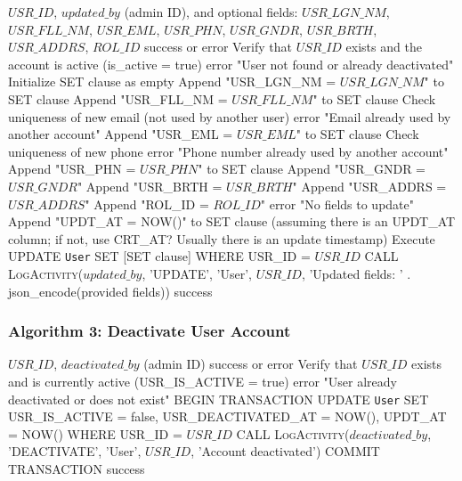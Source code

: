 \begin{algorithm}[H]
	\caption{Update User Account}
	\label{alg:update-user}
	\begin{algorithmic}[1]
		\REQUIRE $USR\_ID$, $updated\_by$ (admin ID), and optional fields: $USR\_LGN\_NM$, $USR\_FLL\_NM$, $USR\_EML$, $USR\_PHN$, $USR\_GNDR$, $USR\_BRTH$, $USR\_ADDRS$, $ROL\_ID$
		\ENSURE success or error
		\STATE Verify that $USR\_ID$ exists and the account is active (is\_active = true)
		\RETURN error "User not found or already deactivated"
		\ENDIF
		\STATE Initialize SET clause as empty
		\STATE Append "USR\_LGN\_NM = $USR\_LGN\_NM$" to SET clause
		\ENDIF
		\STATE Append "USR\_FLL\_NM = $USR\_FLL\_NM$" to SET clause
		\ENDIF
		\STATE Check uniqueness of new email (not used by another user)
		\RETURN error "Email already used by another account"
		\ENDIF
		\STATE Append "USR\_EML = $USR\_EML$" to SET clause
		\ENDIF
		\STATE Check uniqueness of new phone
		\RETURN error "Phone number already used by another account"
		\ENDIF
		\STATE Append "USR\_PHN = $USR\_PHN$" to SET clause
		\ENDIF
		 \STATE Append "USR\_GNDR = $USR\_GNDR$" \ENDIF
		 \STATE Append "USR\_BRTH = $USR\_BRTH$" \ENDIF
		 \STATE Append "USR\_ADDRS = $USR\_ADDRS$" \ENDIF
		 \STATE Append "ROL\_ID = $ROL\_ID$" \ENDIF
		\RETURN error "No fields to update"
		\ENDIF
		\STATE Append "UPDT\_AT = NOW()" to SET clause  (assuming there is an UPDT\_AT column; if not, use CRT\_AT? Usually there is an update timestamp)
		\STATE Execute UPDATE \texttt{User} SET [SET clause] WHERE USR\_ID = $USR\_ID$
		\STATE CALL \textsc{LogActivity}($updated\_by$, 'UPDATE', 'User', $USR\_ID$, 'Updated fields: ' . json\_encode(provided fields))
		\RETURN success
	\end{algorithmic}
\end{algorithm}
\subsubsection{Algorithm 3: Deactivate User Account}

\begin{algorithm}[H]
	\caption{Deactivate User Account}
	\label{alg:deactivate-user}
	\begin{algorithmic}[1]
		\REQUIRE $USR\_ID$, $deactivated\_by$ (admin ID)
		\ENSURE success or error
		\STATE Verify that $USR\_ID$ exists and is currently active (USR\_IS\_ACTIVE = true)
		\RETURN error "User already deactivated or does not exist"
		\ENDIF
		\STATE BEGIN TRANSACTION
		\STATE UPDATE \texttt{User} SET 
		USR\_IS\_ACTIVE = false, 
		USR\_DEACTIVATED\_AT = NOW(),
		UPDT\_AT = NOW()
		WHERE USR\_ID = $USR\_ID$
		\STATE CALL \textsc{LogActivity}($deactivated\_by$, 'DEACTIVATE', 'User', $USR\_ID$, 'Account deactivated')
		\STATE COMMIT TRANSACTION
		\RETURN success
	\end{algorithmic}
\end{algorithm}

